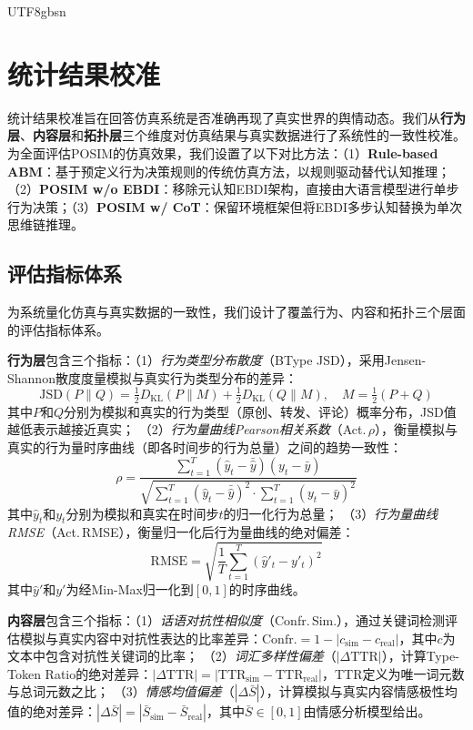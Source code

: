 \documentclass[11pt]{article}
\begin{document}
\begin{CJK}{UTF8}{gbsn}
\sloppy

\section{统计结果校准}

统计结果校准旨在回答仿真系统是否准确再现了真实世界的舆情动态。我们从\textbf{行为层}、\textbf{内容层}和\textbf{拓扑层}三个维度对仿真结果与真实数据进行了系统性的一致性校准。为全面评估POSIM的仿真效果，我们设置了以下对比方法：（1）\textbf{Rule-based ABM}：基于预定义行为决策规则的传统仿真方法，以规则驱动替代认知推理；（2）\textbf{POSIM w/o EBDI}：移除元认知EBDI架构，直接由大语言模型进行单步行为决策；（3）\textbf{POSIM w/ CoT}：保留环境框架但将EBDI多步认知替换为单次思维链推理。

\subsection{评估指标体系}

为系统量化仿真与真实数据的一致性，我们设计了覆盖行为、内容和拓扑三个层面的评估指标体系。

\textbf{行为层}包含三个指标：（1）\textit{行为类型分布散度}（BType JSD），采用Jensen-Shannon散度度量模拟与真实行为类型分布的差异：
\begin{equation}
\text{JSD}(P \| Q) = \tfrac{1}{2} D_{\text{KL}}(P \| M) + \tfrac{1}{2} D_{\text{KL}}(Q \| M), \quad M = \tfrac{1}{2}(P + Q)
\end{equation}
其中$P$和$Q$分别为模拟和真实的行为类型（原创、转发、评论）概率分布，JSD值越低表示越接近真实；
（2）\textit{行为量曲线Pearson相关系数}（Act.\,$\rho$），衡量模拟与真实的行为量时序曲线（即各时间步的行为总量）之间的趋势一致性：
\begin{equation}
\rho = \frac{\sum_{t=1}^{T}(\hat{y}_t - \bar{\hat{y}})(y_t - \bar{y})}{\sqrt{\sum_{t=1}^{T}(\hat{y}_t - \bar{\hat{y}})^2 \cdot \sum_{t=1}^{T}(y_t - \bar{y})^2}}
\end{equation}
其中$\hat{y}_t$和$y_t$分别为模拟和真实在时间步$t$的归一化行为总量；
（3）\textit{行为量曲线RMSE}（Act.\,RMSE），衡量归一化后行为量曲线的绝对偏差：
\begin{equation}
\text{RMSE} = \sqrt{\frac{1}{T}\sum_{t=1}^{T}(\hat{y}'_t - y'_t)^2}
\end{equation}
其中$\hat{y}'$和$y'$为经Min-Max归一化到$[0,1]$的时序曲线。

\textbf{内容层}包含三个指标：（1）\textit{话语对抗性相似度}（Confr.\,Sim.），通过关键词检测评估模拟与真实内容中对抗性表达的比率差异：$\text{Confr.} = 1 - |c_{\text{sim}} - c_{\text{real}}|$，其中$c$为文本中包含对抗性关键词的比率；
（2）\textit{词汇多样性偏差}（$|\Delta\text{TTR}|$），计算Type-Token Ratio的绝对差异：$|\Delta\text{TTR}| = |\text{TTR}_{\text{sim}} - \text{TTR}_{\text{real}}|$，TTR定义为唯一词元数与总词元数之比；
（3）\textit{情感均值偏差}（$|\Delta\bar{S}|$），计算模拟与真实内容情感极性均值的绝对差异：$|\Delta\bar{S}| = |\bar{S}_{\text{sim}} - \bar{S}_{\text{real}}|$，其中$\bar{S} \in [0,1]$由情感分析模型给出。


\end{CJK}
\end{document}
